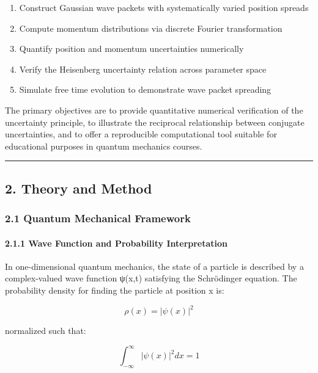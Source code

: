 \documentclass[
  11pt,
]{article}
\providecommand{\tightlist}{%
  \setlength{\itemsep}{0pt}\setlength{\parskip}{0pt}}
\begin{document}
\begin{enumerate}
\def\labelenumi{\arabic{enumi}.}
\tightlist
\item
  Construct Gaussian wave packets with systematically varied position
  spreads
\item
  Compute momentum distributions via discrete Fourier transformation
\item
  Quantify position and momentum uncertainties numerically
\item
  Verify the Heisenberg uncertainty relation across parameter space
\item
  Simulate free time evolution to demonstrate wave packet spreading
\end{enumerate}

The primary objectives are to provide quantitative numerical
verification of the uncertainty principle, to illustrate the reciprocal
relationship between conjugate uncertainties, and to offer a
reproducible computational tool suitable for educational purposes in
quantum mechanics courses.

\begin{center}\rule{0.5\linewidth}{0.5pt}\end{center}

\subsection{2. Theory and Method}\label{theory-and-method}

\subsubsection{2.1 Quantum Mechanical
Framework}\label{quantum-mechanical-framework}

\paragraph{2.1.1 Wave Function and Probability
Interpretation}\label{wave-function-and-probability-interpretation}

In one-dimensional quantum mechanics, the state of a particle is
described by a complex-valued wave function ψ(x,t) satisfying the
Schrödinger equation. The probability density for finding the particle
at position x is:

\[\rho(x) = |\psi(x)|^2\]

normalized such that:

\[\int_{-\infty}^{\infty} |\psi(x)|^2 dx = 1\]
\end{document}

